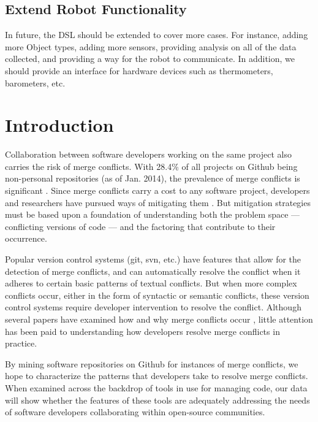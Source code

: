 \documentclass{sig-alternate-05-2015}
\begin{document}
\subsection{Extend Robot Functionality}
In future, the DSL should be extended to cover more cases. For instance, adding more Object types, adding more sensors, providing analysis on all of the data collected, and providing a way for the robot to communicate. In addition, we should provide an interface for hardware devices such as thermometers, barometers, etc.

\iffalse
\section{Introduction}\label{Introduction}
Collaboration between software developers working on the same project also carries the risk of merge conflicts. With 28.4\% of all projects on Github being non-personal repositories (as of Jan. 2014), the prevalence of merge conflicts is significant \cite{kalliamvakou14}. Since merge conflicts carry a cost to any software project, developers and researchers have pursued ways of mitigating them \cite{niu2012}. But mitigation strategies must be based upon a foundation of understanding both the problem space --- conflicting versions of code --- and the factoring that contribute to their occurrence.

Popular version control systems (git, svn, etc.) have features that allow for the detection of merge conflicts, and can automatically resolve the conflict when it adheres to certain basic patterns of textual conflicts. But when more complex conflicts occur, either in the form of syntactic or semantic conflicts, these version control systems require developer intervention to resolve the conflict. Although several papers have examined how and why merge conflicts occur \cite{brun10}\cite{Sarma08}\cite{Guimaraes12}, little attention has been paid to understanding how developers resolve merge conflicts in practice.

By mining software repositories on Github for instances of merge conflicts, we hope to characterize the patterns that developers take to resolve merge conflicts. When examined across the backdrop of tools in use for managing code, our data will show whether the features of these tools are adequately addressing the needs of software developers collaborating within open-source communities.
\end{document}
